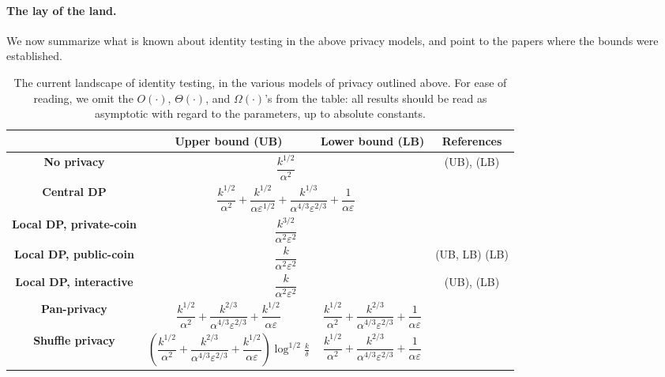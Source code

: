\documentclass[10pt]{article}
\newcommand{\dst}{\alpha}
\newcommand{\ab}{k}
\newcommand{\priv}{\varepsilon}
\begin{document}
\paragraph{The lay of the land.}
We now summarize what is known about identity testing in the above privacy models, and point to the papers where the bounds were established.
\begin{table}[H]\centering
  \def\arraystretch{2.75}%
  \begin{adjustwidth}{-0.5in}{1in}%
  \begin{tabular}{|c|c|c|c|}
  \hline
     & \bf Upper bound (UB) & \bf Lower bound (LB) & \bf References \\\hline
    \bf No privacy & \multicolumn{2}{c|}{$\dfrac{\ab^{1/2}}{\dst^2}$} & \cite{ValiantV17} (UB), \cite{Paninski08} (LB) \\\hline
    \bf Central DP & \multicolumn{2}{c|}{$\dfrac{\ab^{1/2}}{\dst^2}+\dfrac{\ab^{1/2}}{\dst\priv^{1/2}}+\dfrac{\ab^{1/3}}{\dst^{4/3}\priv^{2/3}}+\dfrac{1}{\dst\priv}$} & \cite{AcharyaSZ18,AliakbarpourDR18} \\\hline
    \bf Local DP, private-coin & \multicolumn{2}{c|}{$\dfrac{\ab^{3/2}}{\dst^2\priv^2}$} & \cite{AcharyaCFT19,AcharyaCT19,AcharyaCHST19}\footnotemark \\\hline
    \bf Local DP, public-coin & \multicolumn{2}{c|}{$\dfrac{\ab}{\dst^2\priv^2}$} & \cite{AcharyaCFT19} (UB, LB) \cite{AcharyaCT19} (LB) \\\hline
    \bf Local DP, interactive & \multicolumn{2}{c|}{$\dfrac{\ab}{\dst^2\priv^2}$} & \cite{AcharyaCFT19} (UB), \cite{KareemMJ19} (LB) \\\hline
    \bf Pan-privacy 
    & $\dfrac{\ab^{1/2}}{\dst^2}+\dfrac{\ab^{2/3}}{\dst^{4/3}\priv^{2/3}}+\dfrac{\ab^{1/2}}{\dst\priv}$ 
    & $\dfrac{\ab^{1/2}}{\dst^2}+\dfrac{\ab^{2/3}}{\dst^{4/3}\priv^{2/3}}+\dfrac{1}{\dst\priv}$ 
    & \cite{KareemMJ19} \\\hline
    \bf Shuffle privacy & $\left(\dfrac{\ab^{1/2}}{\dst^2}+\dfrac{\ab^{2/3}}{\dst^{4/3}\priv^{2/3}}+\dfrac{\ab^{1/2}}{\dst\priv}\right)\log^{1/2}\frac{\ab}{\delta}$ 
    & $\dfrac{\ab^{1/2}}{\dst^2}+\dfrac{\ab^{2/3}}{\dst^{4/3}\priv^{2/3}}+\dfrac{1}{\dst\priv}$ & \cite{BalcerCJM20} \\\hline
  \end{tabular}
  \end{adjustwidth}
  \caption{The current landscape of identity testing, in the various models of privacy outlined above. For ease of reading, we omit the $O(\cdot)$, $\Theta(\cdot)$, and $\Omega(\cdot)$'s from the table: all results should be read as asymptotic with regard to the parameters, up to absolute constants.}
\end{table}
\end{document}
